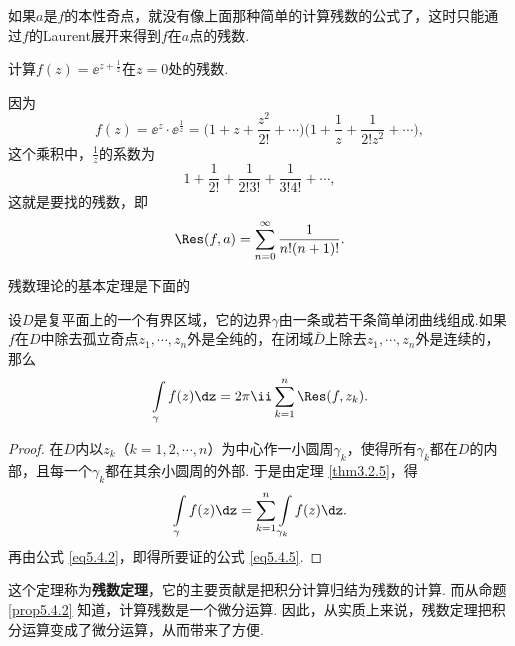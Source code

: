 如果$a$是$f$的本性奇点，就没有像上面那种简单的计算残数的公式了，这时只能通过$f$的Laurent展开来得到$f$在$a$点的残数.

\begin{example}\label{exam5.4.8}
计算$f(z)=\ee^{z+\frac1z}$在$z=0$处的残数.
\end{example}
\begin{solution}
因为
\[f(z)=\ee^z\cdot\ee^{\frac1z}=
\bigg(1+z+\frac{z^2}{2!}+\cdots\bigg)\bigg(1+\frac1z+\frac1{2!z^2}+\cdots\bigg),\]
这个乘积中，$\frac1z$的系数为
\[1+\frac1{2!}+\frac1{2!3!}+\frac1{3!4!}+\cdots,\]
这就是要找的残数，即
\begin{equation*}
  \Res(f,a) = \sum_{n=0}^\infty\frac1{n!(n+1)!}. \qedhere
\end{equation*}
\end{solution}

残数理论的基本定理是下面的
\begin{theorem}\label{thm5.4.9}
设$D$是复平面上的一个有界区域，它的边界$\gamma$由一条或若干条简单闭曲线组成.如果$f$在$D$中除去孤立奇点$z_1,\cdots,z_n$外是全纯的，在闭域$\bar D$上除去$z_1,\cdots,z_n$外是连续的，那么
\begin{equation}\label{eq5.4.5}
\int\limits_\gamma f(z)\dz=2\pi\ii\sum_{k=1}^n\Res(f,z_k).
\end{equation}
\end{theorem}
\begin{proof}
在$D$内以$z_k$（$k=1,2,\cdots,n$）为中心作一小圆周$\gamma_k$，使得所有$\gamma_k$都在$D$的内部，且每一个$\gamma_k$都在其余小圆周的外部. 于是由定理 \ref{thm3.2.5}，得
\[\int\limits_\gamma f(z)\dz=\sum_{k=1}^n\int\limits_{\gamma_k}f(z)\dz.\]
再由公式 \eqref{eq5.4.2}，即得所要证的公式 \eqref{eq5.4.5}.
\end{proof}

这个定理称为\textbf{残数定理}，它的主要贡献是把积分计算归结为残数的计算. 而从命题 \ref{prop5.4.2} 知道，计算残数是一个微分运算. 因此，从实质上来说，残数定理把积分运算变成了微分运算，从而带来了方便.


